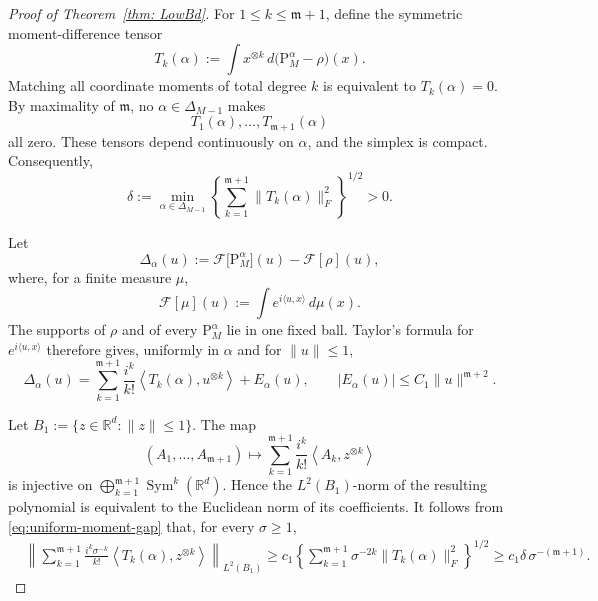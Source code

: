 \documentclass[12pt]{iopart}
\theoremstyle{remark}
\begin{document}
\begin{proof}[Proof of Theorem~\ref{thm: LowBd}]

For \(1\leq k\leq \mathfrak{m}+1\), define the symmetric
moment-difference tensor
\[
  T_k(\alpha)
  :=
  \int x^{\otimes k}\,
  d\bigl(\mathrm{P}_M^\alpha-\rho\bigr)(x).
\]
Matching all coordinate moments of total degree \(k\) is equivalent to
\(T_k(\alpha)=0\). By maximality of \(\mathfrak{m}\), no
\(\alpha\in\Delta_{M-1}\) makes
\[
  T_1(\alpha),\ldots,T_{\mathfrak{m}+1}(\alpha)
\]
all zero. These tensors depend continuously on \(\alpha\), and the
simplex is compact. Consequently,
\begin{equation}
  \delta
  :=
  \min_{\alpha\in\Delta_{M-1}}
  \left\{
    \sum_{k=1}^{\mathfrak{m}+1}
    \|T_k(\alpha)\|_F^2
  \right\}^{1/2}
  >0.
  \label{eq:uniform-moment-gap}
\end{equation}

Let
\[
  \Delta_\alpha(u)
  :=
  \mathcal{F}\bigl[\mathrm{P}_M^\alpha\bigr](u)
  -
  \mathcal{F}[\rho](u),
\]
where, for a finite measure \(\mu\),
\[
  \mathcal{F}[\mu](u)
  :=
  \int e^{i\langle u,x\rangle}\,d\mu(x).
\]
The supports of \(\rho\) and of every \(\mathrm{P}_M^\alpha\) lie in
one fixed ball. Taylor's formula for \(e^{i\langle u,x\rangle}\)
therefore gives, uniformly in \(\alpha\) and for \(\|u\|\leq 1\),
\begin{equation}
  \Delta_\alpha(u)
  =
  \sum_{k=1}^{\mathfrak{m}+1}
  \frac{i^k}{k!}
  \left\langle T_k(\alpha),u^{\otimes k}\right\rangle
  +
  E_\alpha(u),
  \qquad
  |E_\alpha(u)|
  \leq
  C_1\|u\|^{\mathfrak{m}+2}.
  \label{eq:uniform-characteristic-expansion}
\end{equation}

Let $B_1:=\{z\in\mathbb R^d:\|z\|\leq1\}$. The map
\[
  (A_1,\ldots,A_{\mathfrak{m}+1})
  \longmapsto
  \sum_{k=1}^{\mathfrak{m}+1}
  \frac{i^k}{k!}
  \left\langle A_k,z^{\otimes k}\right\rangle
\]
is injective on
\(
  \bigoplus_{k=1}^{\mathfrak{m}+1}
  \operatorname{Sym}^k(\mathbb{R}^d).
\)
Hence the \(L^2(B_1)\)-norm of the resulting polynomial is equivalent
to the Euclidean norm of its coefficients. It follows from
\eqref{eq:uniform-moment-gap} that, for every \(\sigma\geq 1\),
\begin{align}
  &\left\|
    \sum_{k=1}^{\mathfrak{m}+1}
    \frac{i^k\sigma^{-k}}{k!}
    \left\langle T_k(\alpha),z^{\otimes k}\right\rangle
  \right\|_{L^2(B_1)}
\geq
  c_1
  \left\{
    \sum_{k=1}^{\mathfrak{m}+1}
    \sigma^{-2k}\|T_k(\alpha)\|_F^2
  \right\}^{1/2}
  \geq
  c_1\delta\,
  \sigma^{-(\mathfrak{m}+1)}.
  \label{eq:polynomial-norm-lower-bound}
\end{align}


\end{proof}
\end{document}

